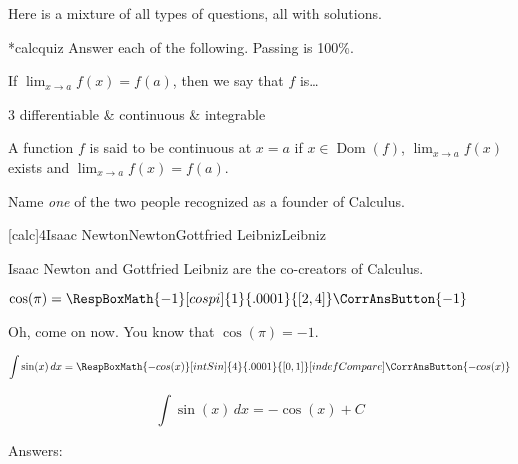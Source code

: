 \documentclass{article}
\begin{document}
Here is a mixture of all types of questions, all with solutions.

\useBeginQuizButton[\CA{Begin}]
\useEndQuizButton[\CA{Finish}]

\begin{quiz}*{calcquiz} Answer each of the following. Passing
is 100\%.

\begin{questions}

\item If $\lim_{x\to a} f(x) = f(a)$, then we say that $f$ is\dots
\begin{answers}[cont]3
 differentiable & continuous & integrable
\end{answers}
\begin{solution}
A function $f$ is said to be continuous at $x=a$ if $x\in\operatorname{Dom}(f)$,
$\lim_{x\to a} f(x) $ exists and $\lim_{x\to a} f(x) = f(a)$.
\end{solution}

\item Name \emph{one} of the two people recognized as a founder of
Calculus.\par\kern3pt
[calc]{4}{Isaac Newton}{Newton}{Gottfried Leibniz}{Leibniz}%
\begin{solution}
Isaac Newton and Gottfried Leibniz are the co-creators of Calculus.
\end{solution}

\item $\cos(\pi) = \RespBoxMath{-1}[cospi]{1}{.0001}{[2,4]}\CorrAnsButton{-1}$
\begin{solution}
Oh, come on now. You know that $\cos(\pi)=-1$.
\end{solution}

\item $\displaystyle\int \sin(x)\,dx =
\RespBoxMath{-cos(x)}[intSin]{4}{.0001}{[0,1]}[indefCompare]\CorrAnsButton{-cos(x)}$
\begin{solution}
\relax\begin{equation*}
        \int \sin(x) \,dx = -\cos(x) + C
\end{equation*}
\adjDisplayBelow
\end{solution}

\end{questions}
\end{quiz}\quad\ScoreField\currQuiz\eqButton\currQuiz

\noindent
Answers: \AnswerField\currQuiz
\end{document}
